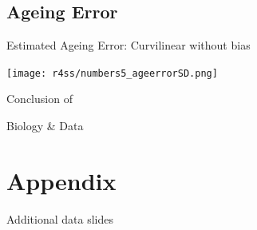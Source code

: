 \documentclass[pdf]{beamer}\usepackage[]{graphicx}\usepackage[]{color}
\begin{document}
\subsection{Ageing Error}
\begin{frame}{Estimated Ageing Error: Curvilinear without bias}
  \begin{center}
    \texttt{[image: r4ss/numbers5\_ageerrorSD.png]}
  \end{center}
\end{frame}

\begin{frame}
  \Huge{\centerline{Conclusion of}}
  \Huge{\centerline{Biology \& Data}}
\end{frame}

\section*{Appendix}
\begin{frame}
  \Huge{\centerline{Additional data slides}}
\end{frame}
\end{document}
